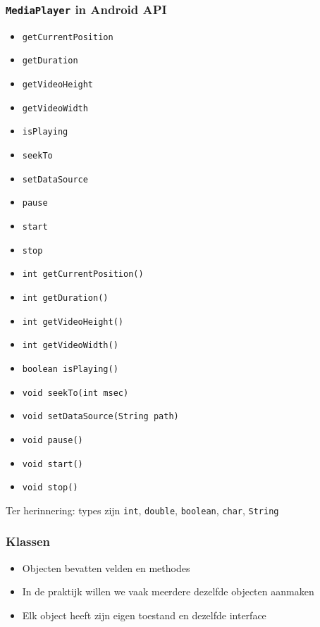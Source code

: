 \begin{frame}
  \frametitle{{\tt MediaPlayer} in Android API}
  \begin{overprint}
    \begin{itemize}
      \item {\tt getCurrentPosition}
      \item {\tt getDuration}
      \item {\tt getVideoHeight}
      \item {\tt getVideoWidth}
      \item {\tt isPlaying}
      \item {\tt seekTo}
      \item {\tt setDataSource}
      \item {\tt pause}
      \item {\tt start}
      \item {\tt stop}
    \end{itemize}

    \begin{itemize}
      \item {\tt int getCurrentPosition()}
      \item {\tt int getDuration()}
      \item {\tt int getVideoHeight()}
      \item {\tt int getVideoWidth()}
      \item {\tt boolean isPlaying()}
      \item {\tt void seekTo(int msec)}
      \item {\tt void setDataSource(String path)}
      \item {\tt void pause()}
      \item {\tt void start()}
      \item {\tt void stop()}
    \end{itemize}
  \end{overprint}
  \vskip2mm
  Ter herinnering: types zijn {\tt int}, {\tt double}, {\tt boolean}, {\tt char}, {\tt String}
\end{frame}

\begin{frame}
  \frametitle{Klassen}
  \begin{itemize}
    \item Objecten bevatten velden en methodes
    \item In de praktijk willen we vaak meerdere dezelfde objecten aanmaken
    \item Elk object heeft zijn eigen toestand en dezelfde interface
  \end{itemize}
  \begin{center}
  \end{center}
\end{frame}

